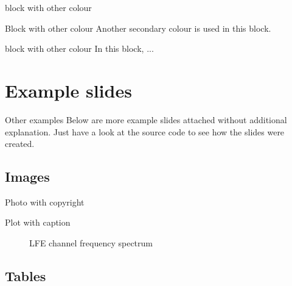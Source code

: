 \documentclass[xcolor={svgnames},12pt,aspectratio=169,handout]{beamer}
\begin{document}
\begin{frame}[fragile]{block with other colour}
    \begingroup
        \begin{block}{Block with other colour}
            Another secondary colour is used in this block.
        \end{block}
    \endgroup

    \begingroup
        \begin{block}{block with other colour}
            In this block, ...
        \end{block}
    \endgroup
\end{frame}

\section{Example slides}

\begin{frame}{Other examples}
    Below are more example slides attached without additional explanation.
    Just have a look at the source code to see how the slides were created.
\end{frame}

\subsection{Images}

\begin{frame}{Photo with copyright}
    \begin{figure}
        \centering
    \end{figure}
\end{frame}

\begin{frame}{Plot with caption}
    \begin{figure}
        \centering
        \caption{LFE channel frequency spectrum}
    \end{figure}
\end{frame}

\subsection{Tables}
\end{document}
